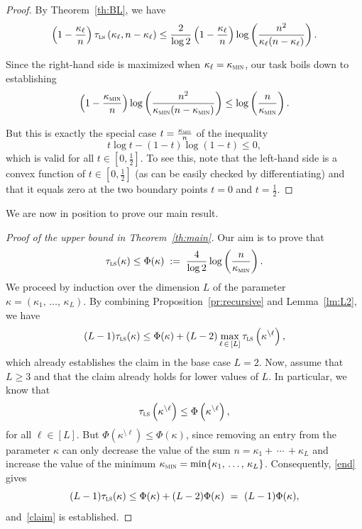 \documentclass[AHL,Unicode,longabstracts,published]{cedram}
\newcommand{\tls}{\tau_{\textsc{ls}}}
\newcommand{\am}{{\kappa_{\textsc{min}}}}
\begin{document}
\begin{proof}
By Theorem~\ref{th:BL}, we have
\[
\left(1-\frac{\kappa_\ell}{n}\right)\tls\left(\kappa_\ell,n-\kappa_\ell\right) \le \frac{2}{\log 2}\left(1-\frac{\kappa_\ell}{n}\right)\log\left(\frac{n^2}{\kappa_\ell(n-\kappa_\ell)}\right).
\]

Since the right-hand side is maximized when $\kappa_\ell=\am$, our task boils down to establishing
\[
\left(1-\frac{\am}{n}\right)\log\left(\frac{n^2}{\am(n-\am)}\right) \le \log\left(\frac{n}{\am}\right).
\]

But this is exactly the special case $t=\tfrac{\am}{n}$ of the inequality
\[
t\log t-(1-t)\log\left(1-t\right) \le 0,
\]
which is valid for all $t\in[0,\frac 12]$. To see this, note that the left-hand side is a convex function of $t\in[0,\frac 12]$ (as can be easily checked by differentiating) and that it equals zero at the two boundary points $t=0$ and $t=\frac 12$.
\end{proof}

We are now in position to prove our main result.

\begin{proof}[Proof of the upper bound in Theorem~\ref{th:main}]Our aim is to prove that
\begin{equation}\label{claim}
\tls(\kappa) \le \Phi(\kappa) \; := \; \frac{4}{\log 2}\log\left(\frac{n}{\am}\right).
\end{equation}
We proceed by induction over the dimension $L$ of the parameter $\kappa=(\kappa_1,\,\ldots,\,\kappa_L)$. By combining Proposition~\ref{pr:recursive} and Lemma~\ref{lm:L2}, we have
\begin{equation}\label{end}
(L-1)\tls(\kappa) \le \Phi(\kappa)+(L-2)\max_{\ell\,\in\,[L]}\tls\left(\kappa^{\setminus\ell}\right),
\end{equation}
which already establishes the claim in the base case $L=2$. Now, assume that $L\ge 3$ and that the claim already holds for lower values of $L$. In particular, we know that
\[
\tls\left(\kappa^{\setminus \ell}\right) \le \Phi\left(\kappa^{\setminus \ell}\right),
\]
for all $\ell\in[L]$. But $\Phi(\kappa^{\setminus\ell})\le \Phi(\kappa)$, since removing an entry from the parameter $\kappa$ can only decrease the value of the sum $n=\kappa_1+\,\cdots\,+\kappa_L$ and increase the value of the minimum $\am=\min\{\kappa_1,\,\ldots,\,\kappa_L\}$. Consequently, \eqref{end} gives
\[
(L-1)\tls(\kappa) \le \Phi(\kappa)+(L-2)\Phi(\kappa)\ =\ (L-1)\Phi(\kappa),
\]
and~\eqref{claim} is established.
\end{proof}
\end{document}
